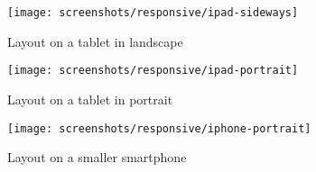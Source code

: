 \begin{figure}[h]
    \centering
    \texttt{[image: screenshots/responsive/ipad-sideways]}
    \caption{Layout on a tablet in landscape}
    \label{fig:responsive-ipad}
\end{figure}

\begin{figure}[h]
    \centering
    \texttt{[image: screenshots/responsive/ipad-portrait]}
    \caption{Layout on a tablet in portrait}
    \label{fig:responsive-ipad2}
\end{figure}

\begin{figure}[h]
    \centering
    \texttt{[image: screenshots/responsive/iphone-portrait]}
    \caption{Layout on a smaller smartphone}
    \label{fig:responsive-iphone}
\end{figure}




